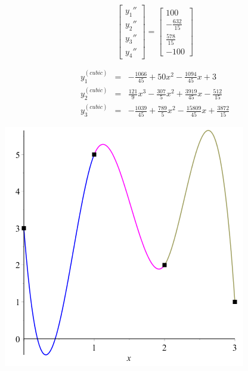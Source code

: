 \documentclass[11pt]{article} %
\begin{document}
$$
\begin{bmatrix} y_1'' \\ y_2'' \\ y_3'' \\ y_4'' \end{bmatrix} = 
\begin{bmatrix} 100 \\ -\frac{632}{15} \\\frac{578}{15} \\ -100\end{bmatrix}$$

$$\begin{array}{lclcl} y^{(cubic)}_1 & = & -\frac{1066}{45} + 50x^2 - \frac{1094}{45}x + 3  \\
		        y^{(cubic)}_2  & = & \frac{121}{9}x^3 - \frac{307}{5}x^2 + \frac{3919}{45}x - \frac{512}{15} \\
		        y^{(cubic)}_3  & = & -\frac{1039}{45} + \frac{789}{5}x^2 - \frac{15809}{45}x + \frac{3872}{15}
\end{array}$$

\begin{center}
\includegraphics[scale=.5]{plots/problem4plot2.png}
\end{center}
\end{document}
